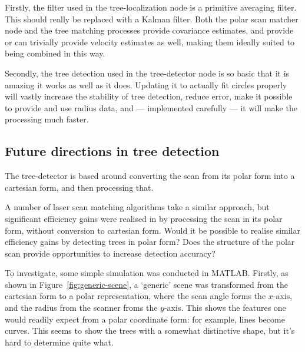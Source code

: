 \documentclass[12pt,oneside,a4paper]{book}
\begin{document}
Firstly, the filter used in the tree-localization node is a primitive
averaging filter. This should really be replaced with a Kalman
filter. Both the polar scan matcher node and the tree matching
processes provide covariance estimates, and provide or can trivially
provide velocity estimates as well, making them ideally suited to
being combined in this way.

Secondly, the tree detection used in the tree-detector node is so
basic that it is amazing it works as well as it does. Updating it to
actually fit circles properly will vastly increase the stability of
tree detection, reduce error, make it possible to provide and use
radius data, and --- implemented carefully --- it will make the
processing much faster.

\subsection{Future directions in tree detection}
\label{sec:future-direct-tree}

The tree-detector is based around converting the scan from its polar
form into a cartesian form, and then processing that.

A number of laser scan matching algorithms take a similar approach,
but significant efficiency gains were realised in
\cite{polarscanmatching} by processing the scan in its polar form,
without conversion to cartesian form. Would it be possible to realise
similar efficiency gains by detecting trees in polar form? Does the
structure of the polar scan provide opportunities to increase
detection accuracy?

To investigate, some simple simulation was conducted in MATLAB. 
\newpage
Firstly, as shown in Figure~\ref{fig:generic-scene}, a `generic' scene
was transformed from the cartesian form to a polar representation,
where the scan angle forms the $x$-axis, and the radius from the
scanner froms the $y$-axis. This shows the features one would readily
expect from a polar coordinate form: for example, lines become
curves. This seems to show the trees with a somewhat distinctive
shape, but it's hard to determine quite what.
\end{document}
